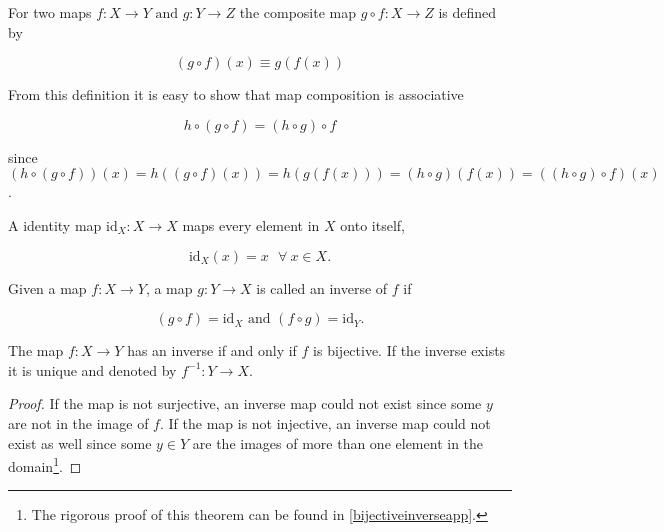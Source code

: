 \documentclass[a4paper,12pt]{report}
\begin{document}
\begin{definition}
For two maps \(f:X \rightarrow Y \text { and } g: Y \rightarrow Z\) the composite map  \(g \circ f: X \rightarrow Z\) is defined by

\begin{equation}
    (g \circ f)(x) \equiv g(f(x))
\end{equation}

\end{definition}

From this definition it is easy to show that map composition is associative

\begin{equation}
    h \circ (g \circ  f) = (h \circ  g) \circ f
\end{equation}

since \((h \circ (g \circ f))(x) = h((g \circ f)(x)) = h(g(f(x))) = (h \circ g)(f(x)) = ((h \circ g) \circ f)(x)\).

\begin{definition}
A identity map \(\mathrm{id}_{X} : X \rightarrow X\)  maps every element in \(X\) onto itself, \ie 

\begin{equation}
    \mathrm{id}_{X} (x) = x ~~~  \forall ~ x \in  X.
\end{equation}
\end{definition}

\begin{definition}
Given a map \(f: X \rightarrow Y\), a map \(g: Y \rightarrow X\) is called an inverse of \(f\) if

\begin{equation}
    (g \circ  f) = \mathrm{id}_{X} \text { and } (f \circ g) = \mathrm{id}_{Y}. 
\end{equation}

\end{definition}

\begin{theorem} \label{bijectiveinverse} 
The map \(f: X \rightarrow Y\) has an inverse if and only if \(f\) is bijective. If the inverse exists it is unique and denoted by \(f^{-1} : Y \rightarrow X\). 
\end{theorem}

\begin{proof}
    If the map is not surjective, an inverse map could not exist since some \(y\) are not in the image of \(f\). If the map is not injective, an inverse map could not exist as well since some \(y \in  Y\) are the images of more than one element in the domain\footnote{The rigorous proof of this theorem can be found in \cref{bijectiveinverseapp}.}.
\end{proof}
\end{document}
